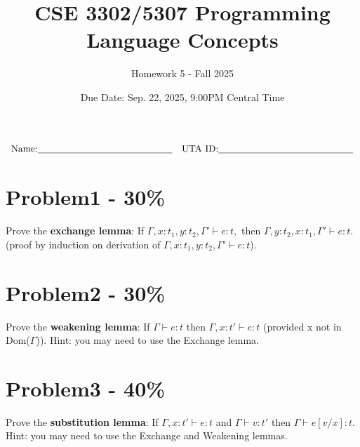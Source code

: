 \documentclass{article}
\newcommand{\answerboxbig}{
    \vspace{20cm} %
}
\newcommand{\studentinfo}{
    $$\begin{array}{cc}
        \noindent \text{Name:} \underline{\hspace{5cm}} &
            \text{UTA ID:} \underline{\hspace{5cm}}\\
    \end{array}$$
}
\begin{document}
\title{CSE 3302/5307 Programming Language Concepts}
\author{Homework 5 - Fall 2025}
\date{Due Date: Sep. 22, 2025, 9:00PM Central Time}
\maketitle
\thispagestyle{fancy}

\studentinfo

\section*{Problem1 - 30\%}

Prove the \textbf{exchange lemma}: If $\Gamma, x:t_1,y:t_2, \Gamma'\vdash e:t, $ then $\Gamma, y:t_2, x:t_1, \Gamma' \vdash e:t.$ (proof by induction on derivation of $\Gamma, x:t_1, y:t_2, \Gamma' \vdash e:t$).
\answerboxbig


\section*{Problem2 - 30\%}

Prove the \textbf{weakening lemma}: If $\Gamma \vdash e:t$ then $\Gamma,x:t' \vdash e:t$ (provided x not in Dom($\Gamma$)). Hint: you may need to use the Exchange lemma.
\answerboxbig


\section*{Problem3 - 40\%}

Prove the \textbf{substitution lemma}: If $\Gamma,x:t' \vdash e:t$ and $\Gamma \vdash v:t'$ then $\Gamma \vdash e[v/x]:t$. Hint: you may need to use the Exchange and Weakening lemmas.
\answerboxbig
\end{document}
